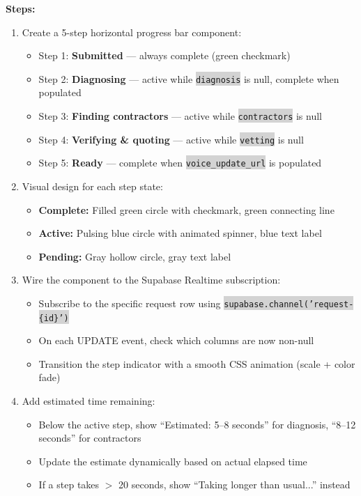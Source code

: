 \documentclass[11pt, a4paper]{article}
\newcommand{\code}[1]{\texttt{\small\colorbox{lightgray}{#1}}}
\begin{document}
\textbf{Steps:}
\begin{enumerate}[leftmargin=2em, itemsep=2pt]
  \item Create a 5-step horizontal progress bar component:
    \begin{itemize}[itemsep=1pt]
      \item Step 1: \textbf{Submitted} --- always complete (green checkmark)
      \item Step 2: \textbf{Diagnosing} --- active while \code{diagnosis} is null, complete when populated
      \item Step 3: \textbf{Finding contractors} --- active while \code{contractors} is null
      \item Step 4: \textbf{Verifying \& quoting} --- active while \code{vetting} is null
      \item Step 5: \textbf{Ready} --- complete when \code{voice\_update\_url} is populated
    \end{itemize}

  \item Visual design for each step state:
    \begin{itemize}[itemsep=1pt]
      \item \textbf{Complete:} Filled green circle with checkmark, green connecting line
      \item \textbf{Active:} Pulsing blue circle with animated spinner, blue text label
      \item \textbf{Pending:} Gray hollow circle, gray text label
    \end{itemize}

  \item Wire the component to the Supabase Realtime subscription:
    \begin{itemize}[itemsep=1pt]
      \item Subscribe to the specific request row using \code{supabase.channel('request-\{id\}')}
      \item On each UPDATE event, check which columns are now non-null
      \item Transition the step indicator with a smooth CSS animation (scale + color fade)
    \end{itemize}

  \item Add estimated time remaining:
    \begin{itemize}[itemsep=1pt]
      \item Below the active step, show ``Estimated: 5--8 seconds'' for diagnosis, ``8--12 seconds'' for contractors
      \item Update the estimate dynamically based on actual elapsed time
      \item If a step takes $>$ 20 seconds, show ``Taking longer than usual...'' instead
    \end{itemize}
\end{enumerate}
\end{document}
